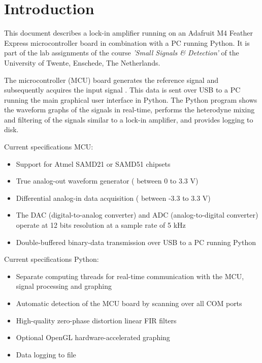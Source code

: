 \section{Introduction}

This document describes a lock-in amplifier running on an Adafruit M4 Feather Express microcontroller board in combination with a PC running Python. It is part of the lab assignments of the course \textit{'Small Signals \& Detection'} of the University of Twente, Enschede, The Netherlands.

The microcontroller (MCU) board generates the reference signal  and subsequently acquires the input signal \sigI{}. This data is sent over USB to a PC running the main graphical user interface in Python. The Python program shows the waveform graphs of the signals in real-time, performs the heterodyne mixing and filtering of the signals similar to a lock-in amplifier, and provides logging to disk.

\bigskip\noindent
Current specifications MCU:
\begin{itemize}
\item{Support for Atmel SAMD21 or SAMD51 chipsets}
\item{True analog-out waveform generator ( between 0 to 3.3 V)}
\item{Differential analog-in data acquisition (\sigI{} between -3.3 to 3.3 V)}
\item{The DAC (digital-to-analog converter) and ADC (analog-to-digital converter) operate at 12 bits resolution at a sample rate of 5 kHz}
\item{Double-buffered binary-data transmission over USB to a PC running Python}
\end{itemize}

\bigskip\noindent
Current specifications Python:
\begin{itemize}
\item{Separate computing threads for real-time communication with the MCU, signal processing and graphing}
\item{Automatic detection of the MCU board by scanning over all COM ports}
\item{High-quality zero-phase distortion linear FIR filters}
\item{Optional OpenGL hardware-accelerated graphing}
\item{Data logging to file}
\end{itemize}

